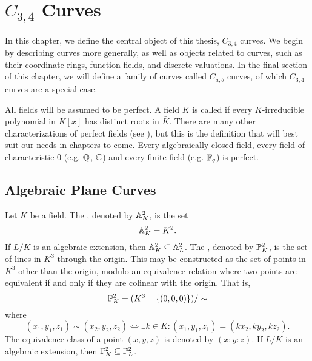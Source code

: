 
\section{$C_{3,4}$ Curves}
\label{chap_curves}

In this chapter, we define the central object of this thesis, $C_{3,4}$ curves.
We begin by describing curves more generally, as well as objects related to curves,
such as their coordinate rings, function fields, and discrete valuations.
In the final section of this chapter, we will define a family of curves called $C_{a,b}$ curves,
of which $C_{3,4}$ curves are a special case.

All fields will be assumed to be perfect.
A field $K$ is called  if every $K$-irreducible polynomial in $K[x]$
has distinct roots in $\bar K$.
There are many other characterizations of perfect fields (see \cite{hungerford}),
but this is the definition that will best suit our needs in chapters to come.
Every algebraically closed field,
every field of characteristic 0 (e.g. $\mathbb{Q}$, $\mathbb{C}$)
and every finite field (e.g. $\mathbb{F}_q$) is perfect.




\subsection{Algebraic Plane Curves}

Let $K$ be a field.
The , denoted by $\mathbb{A}_K^2$, is the set
\[ \mathbb{A}_K^2 = K^2. \]
If $L/K$ is an algebraic extension, then $\mathbb{A}_K^2 \subseteq \mathbb{A}_L^2$.
The , denoted by $\mathbb{P}_K^2$, is the set of lines in $K^3$ through the origin.
This may be constructed as the set of points in $K^3$ other than the origin,
modulo an equivalence relation where two points are equivalent if and only if they are colinear with the origin.
That is,
\[ \mathbb{P}_K^2 = (K^3 - \{(0,0,0)\})/\sim \]
where
\[ (x_1, y_1, z_1) \sim (x_2, y_2, z_2) \iff \exists k \in K : (x_1, y_1, z_1) = (kx_2, ky_2, kz_2). \]
The equivalence class of a point $(x, y, z)$ is denoted by $(x : y : z)$.
If $L/K$ is an algebraic extension, then $\mathbb{P}_K^2 \subseteq \mathbb{P}_L^2$.

